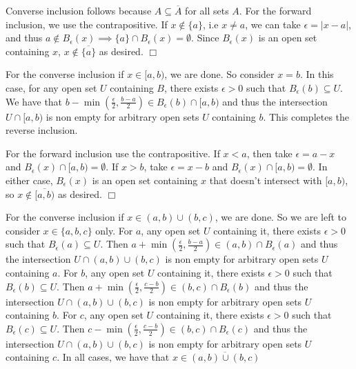 \documentclass{article}
\begin{document}
\beasy [rclosures]{
    Show the following facts in $\bru$. Let $a < b <c\in \bR$,
    \begin{enumerate}
        \item $\overline{\{a\}} = \{a\}$
        \item $\overline{[a,b)} = [a,b]$
        \item $\overline{(a,b)\cup(b,c)} = [a,c]$
        \item $\overline{[a,b]} = [a,b]$
        \item If $(x_{n})_{n = 1}^{\infty}$ is a sequence converging to $x\in \bR$, then $\overline{\{x_{n}:\ n\in \bN\}} = \{x_{n}:\ n\in \bN\}\cup \{x\} $
    \end{enumerate}
} {
    \begin{spacedenumerate}
        \item Converse inclusion follows because $A\subseteq \overline{A}$ for all sets $A$. For the forward inclusion, we use the contrapositive. If $x\not\in \{a\}$, i.e $x\neq a$, we can take $\epsilon = \lvert x-a\rvert$, and thus $a\not\in B_{\epsilon}(x) \implies \{a\}\cap B_{\epsilon}(x) = \emptyset$. Since $B_{\epsilon}(x)$ is an open set containing $x$, $x\not\in \overline{\{a\}}$ as desired. $\Box$
        \item For the converse inclusion if $x\in [a, b)$, we are done. So consider $x = b$. In this case, for any open set $U$ containing $B$, there exists $\epsilon > 0$ such that $B_{\epsilon}(b)\subseteq U$. We have that $b - \min\left(\frac{\epsilon}{2}, \frac{b-a}{2}\right)\in B_{\epsilon}(b)\cap [a,b)$ and thus the intersection $U\cap [a,b)$ is non empty for arbitrary open sets $U$ containing $b$. This completes the reverse inclusion.
        
        For the forward inclusion use the contrapositive. If $x < a$, then take $\epsilon = a - x$ and $B_{\epsilon}(x)\cap [a,b) = \emptyset$. If $x > b$, take $\epsilon = x-b$ and $B_{\epsilon}(x)\cap[a,b) = \emptyset$. In either case, $B_{\epsilon}(x)$ is an open set containing $x$ that doesn't intersect with $[a,b)$, so $x\not\in \overline{[a,b)}$ as desired. $\Box$
        \item For the converse inclusion if $x\in (a, b)\cup (b,c)$, we are done. So we are left to consider $x\in \{a,b,c\}$ only. For $a$, any open set $U$ containing it, there exists $\epsilon > 0$ such that $B_{\epsilon}(a)\subseteq U$. Then $a + \min\left(\frac{\epsilon}{2},\frac{b-a}{2}\right)\in (a,b)\cap B_{\epsilon}(a)$ and thus the intersection $U\cap (a,b)\cup (b,c)$ is non empty for arbitrary open sets $U$ containing $a$. For $b$, any open set $U$ containing it, there exists $\epsilon > 0$ such that $B_{\epsilon}(b)\subseteq U$. Then $a + \min\left(\frac{\epsilon}{2},\frac{c-b}{2}\right)\in (b,c)\cap B_{\epsilon}(b)$ and thus the intersection $U\cap (a,b)\cup (b,c)$ is non empty for arbitrary open sets $U$ containing $b$. For $c$, any open set $U$ containing it, there exists $\epsilon > 0$ such that $B_{\epsilon}(c)\subseteq U$. Then $c - \min\left(\frac{\epsilon}{2},\frac{c-b}{2}\right)\in (b,c)\cap B_{\epsilon}(c)$ and thus the intersection $U\cap (a,b)\cup (b,c)$ is non empty for arbitrary open sets $U$ containing $c$. In all cases, we have that $x\in \overline{(a,b)\cup (b,c)}$  
        

\end{spacedenumerate}}
\end{document}
